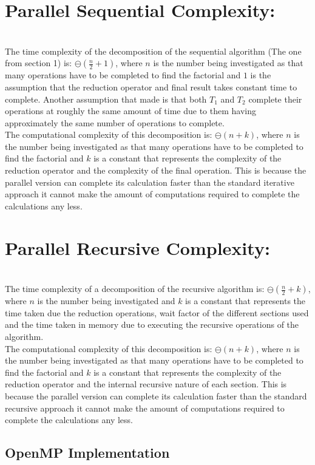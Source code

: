 \documentclass[11pt]{article}
\begin{document}
\begin{page}
\noindent \chapter{Parallel Sequential Complexity:} \\
The time complexity of the decomposition of the sequential algorithm (The one from section 1) is: $\ominus(\frac{n}{2} + 1)$, where $n$ is the number being investigated as that many operations have to be completed to find the factorial and $1$ is the assumption that the reduction operator and final result takes constant time to complete. Another assumption that made is that both $T_1$ and $T_2$ complete their operations at roughly the same amount of time due to them having approximately the same number of operations to complete.\\

\noindent The computational complexity of this decomposition is: $\ominus(n + k)$, where $n$ is the number being investigated as that many operations have to be completed to find the factorial and $k$ is a constant that represents the complexity of the reduction operator and the complexity of the final operation. This is because the parallel version can complete its calculation faster than the standard iterative approach it cannot make the amount of computations required to complete the calculations any less.\\

\noindent \chapter{Parallel Recursive Complexity:} \\
The time complexity of a decomposition of the recursive algorithm is: $\ominus(\frac{n}{2} + k)$, where $n$ is the number being investigated and $k$ is a constant that represents the time taken due the reduction operations, wait factor of the different sections used and the time taken in memory due to executing the recursive operations of the algorithm.\\

\noindent The computational complexity of this decomposition is: $\ominus(n + k)$, where $n$ is the number being investigated as that many operations have to be completed to find the factorial and $k$ is a constant that represents the complexity of the reduction operator and the internal recursive nature of each section. This is because the parallel version can complete its calculation faster than the standard recursive approach it cannot make the amount of computations required to complete the calculations any less.\\ 

\section{OpenMP Implementation}


\end{page}
\end{document}
